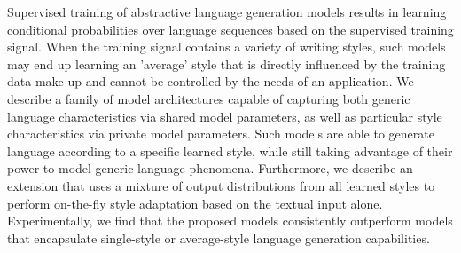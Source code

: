 Supervised training of abstractive language generation models results in learning conditional probabilities over language sequences based on the supervised training signal. When the training signal contains a variety of writing styles, such models may end up learning an 'average' style that is directly influenced by the training data make-up and cannot be controlled by the needs of an application. We describe a family of model architectures capable of capturing both generic language characteristics via shared model parameters, as well as particular style characteristics via private model parameters. Such models are able to generate language according to a specific learned style, while still taking advantage of their power to model generic language phenomena. Furthermore, we describe an extension that uses a mixture of output distributions from all learned styles to perform on-the-fly style adaptation based on the textual input alone. Experimentally, we find that the proposed models consistently outperform models that encapsulate single-style or average-style language generation capabilities.
